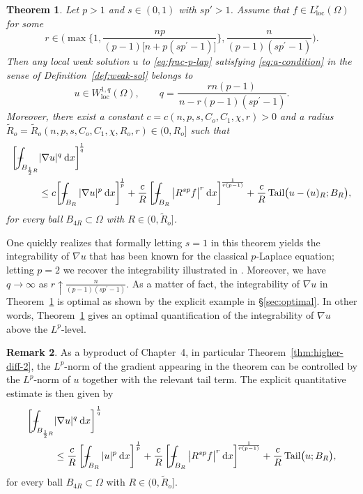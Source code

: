 \documentclass[10pt,letterpaper]{amsart}
\newtheorem{theorem}{Theorem}
\theoremstyle{definition}
\newtheorem{remark}[theorem]{Remark}
\numberwithin{theorem}{section}
\numberwithin{equation}{section}
\newcommand{\1}{\ensuremath{\mathds{1}}}
\def\Xint#1{\mathchoice
    {\XXint\displaystyle\textstyle{#1}}%
    {\XXint\textstyle\scriptstyle{#1}}%
    {\XXint\scriptstyle\scriptscriptstyle{#1}}%
    {\XXint\scriptscriptstyle\scriptscriptstyle{#1}}%
    \!\int}
\def\XXint#1#2#3{\setbox0=\hbox{$#1{#2#3}{\int}$}
    \vcenter{\hbox{$#2#3$}}\kern-0.5\wd0}
\def\bint{\Xint-}
\renewcommand{\d}{\:\! \mathrm{d}}
\DeclareMathOperator{\loc}{loc}
\numberwithin{equation}{section}
\begin{document}
\begin{theorem}\label{Thm:1}
Let $p>1$ and $s\in(0,1)$ with $sp'>1$. Assume that $f\in L^{r}_{\loc}(\Omega)$ for some
\begin{equation}\label{Eq:range-r}
r\in\bigg(\max\bigg\{1,\frac{np}{(p-1)\big[n+p(sp^{\prime}-1)\big]}\bigg\},
\frac{n}{(p-1)(sp^{\prime}-1)}\bigg).
\end{equation}
Then any local weak solution $u$ to \eqref{eq:frac-p-lap} satisfying \eqref{eq:a-condition} in the sense of Definition~\ref{def:weak-sol} belongs to
\[
u\in W^{1,q}_{\loc}(\Omega),
\qquad
q=\frac{rn(p-1)}{\,n-r(p-1)(sp^{\prime}-1)}.
\]
Moreover, there exist a constant $c=c(n,p,s,C_o,C_1,\chi,r)>0$ and a radius $\widetilde R_o=\widetilde R_o(n,p,s,C_o,C_1,\chi, R_o,r)\in (0,R_o]$ such that
\begin{align*}
\bigg[ \bint_{B_{\frac12 R}}& |\nabla u|^{q} \, \d x \bigg]^{\!\frac{1}{q}}\\
&\leq 
c \bigg[\bint_{B_{R}}  |\nabla u|^p  \, \d x\bigg]^{\!\frac{1}{p}}
+ \frac{c}{R}\, \bigg[ \bint_{B_R} \big|R^{sp}f\big|^{r} \, \d x \bigg]^{\!\frac{1}{r(p-1)}}  + \frac{c}{R} \, \mathrm{Tail}\big(u-(u)_R;B_R\big),
\end{align*}
for every ball $B_{4R}\subset\Omega$ with $R\in(0,\widetilde R_o]$.
\end{theorem}




One quickly realizes that formally letting $s=1$ in this theorem yields the integrability of $\nabla u$ that has been known for the classical $p$-Laplace equation; letting $p=2$ we recover the integrability illustrated in \cite[Eqn.~(1.24)]{DKLN-pot}. Moreover, we have $q\to\infty$ as $r\uparrow \frac{n}{(p-1)(sp^{\prime}-1)}$. As a matter of fact, the integrability of $\nabla u$ in Theorem~\ref{Thm:1} is optimal as shown by the explicit example in \S \ref{sec:optimal}. In other words, Theorem~\ref{Thm:1} gives an optimal quantification of the integrability of $\nabla u$ above the $L^p$-level.





\begin{remark}
As a byproduct of Chapter~4, in particular Theorem~\ref{thm:higher-diff-2}, the \(L^p\)-norm of the gradient
appearing in the theorem can be controlled by the
\(L^p\)-norm of \(u\) together with the relevant tail term. The explicit quantitative estimate is then given by
\begin{align*}
    \bigg[ \bint_{B_{\frac12 R}} & |\nabla u|^{q} \, \d x \bigg]^\frac{1}{q} \\
    &\leq 
    \frac{c}{R} \,\bigg[\bint_{B_{R}}  |u|^p  \, \d x\bigg]^\frac{1}{p} + \frac{c}{R}\, \bigg[ \bint_{B_R} \big|R^{sp}f\big|^{r} \, \d x \bigg]^{\!\frac{1}{r(p-1)}} 
    + \frac{c}{R} \, \mathrm{Tail} \big(u;B_R\big),
\end{align*}
for every ball $B_{4R}\subset\Omega$ with $R\in(0,\widetilde R_o]$.
\end{remark}
\end{document}
